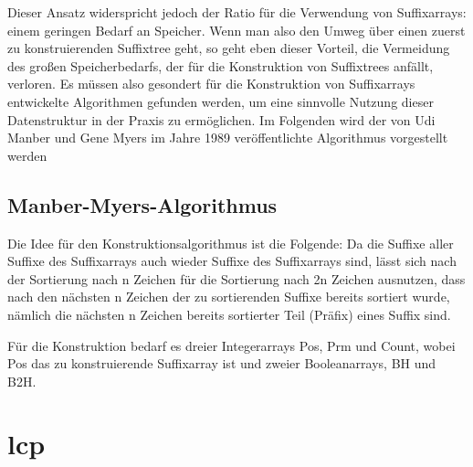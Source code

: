 \documentclass[twoside]{article}
\begin{document}
Dieser Ansatz widerspricht jedoch der Ratio für die Verwendung von Suffixarrays:
einem geringen Bedarf an Speicher.
Wenn man also den Umweg über einen zuerst zu konstruierenden Suffixtree geht, so
geht eben dieser Vorteil, die Vermeidung des großen Speicherbedarfs, der für die
Konstruktion von Suffixtrees anfällt, verloren.
Es müssen also gesondert für die Konstruktion von Suffixarrays entwickelte
Algorithmen gefunden werden, um eine sinnvolle Nutzung dieser Datenstruktur in
der Praxis zu ermöglichen.
Im Folgenden wird der von Udi Manber und Gene Myers im Jahre 1989 veröffentlichte
Algorithmus vorgestellt werden

\subsection{Manber-Myers-Algorithmus}
Die Idee für den Konstruktionsalgorithmus ist die Folgende: Da die Suffixe aller
Suffixe des Suffixarrays auch wieder Suffixe des Suffixarrays sind, lässt sich
nach der Sortierung nach n Zeichen für die Sortierung nach 2n Zeichen ausnutzen,
dass nach den nächsten n Zeichen der zu sortierenden Suffixe bereits sortiert
wurde, nämlich die nächsten n Zeichen bereits sortierter Teil (Präfix) eines Suffix
sind.

Für die Konstruktion bedarf es dreier Integerarrays Pos, Prm und Count, wobei Pos das
zu konstruierende Suffixarray ist und zweier Booleanarrays, BH und B2H.

\section{lcp}


\end{document}
